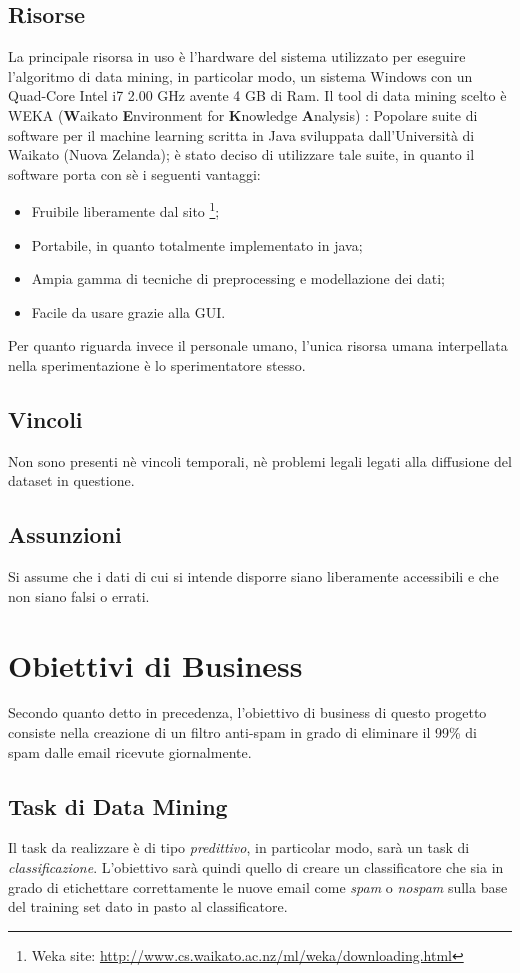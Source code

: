 \subsection{Risorse}
La principale risorsa in uso è l'hardware del sistema utilizzato per eseguire l'algoritmo di data mining, in particolar modo, un sistema Windows con un Quad-Core Intel i7 2.00 GHz avente 4 GB di Ram.
Il tool di data mining scelto è WEKA (\textbf{W}aikato \textbf{E}nvironment for \textbf{K}nowledge \textbf{A}nalysis) \cite{WEKA}:
Popolare suite di software per il machine learning scritta in Java sviluppata dall'Università di Waikato (Nuova Zelanda); è stato deciso di utilizzare tale suite, in quanto il software porta con sè i seguenti vantaggi:
\begin{itemize}
	\item Fruibile liberamente dal sito \footnote{Weka site: \url{http://www.cs.waikato.ac.nz/ml/weka/downloading.html}};
    \item Portabile, in quanto totalmente implementato in java;
    \item Ampia gamma di tecniche di preprocessing e modellazione dei dati;
    \item Facile da usare grazie alla GUI.
\end{itemize}
Per quanto riguarda invece il personale umano, l'unica risorsa umana interpellata nella sperimentazione è lo sperimentatore stesso.
\subsection{Vincoli}
	Non sono presenti nè vincoli temporali, nè problemi legali legati alla diffusione del dataset in questione.
\subsection{Assunzioni}
	Si assume che i dati di cui si intende disporre siano liberamente accessibili e che non siano falsi o errati.
\section{Obiettivi di Business}
	Secondo quanto detto in precedenza, l'obiettivo di business di questo progetto consiste nella creazione di un filtro anti-spam in grado di eliminare il 99\% di spam dalle email ricevute giornalmente.
\subsection{Task di Data Mining}
	\label{task}
	Il task da realizzare è di tipo \textit{predittivo}, in particolar modo, sarà un task di \textit{classificazione}. L'obiettivo sarà quindi quello di creare un classificatore che sia in grado di etichettare correttamente le nuove email come \textit{spam} o \textit{nospam} sulla base del training set dato in pasto al classificatore. 

